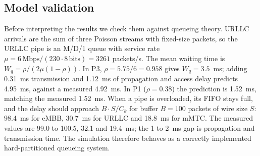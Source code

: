 \documentclass[conference]{IEEEtran}
\begin{document}
\begin{table}[t]
\centering
\caption{Per-phase results of the static 50/30/20 allocation (mean over 5 seeds; $\pm$ is the 95\% CI where it is not negligible)}
\label{tab:summary}
\setlength{\tabcolsep}{4pt}
\end{table}

\subsection{Model validation}
Before interpreting the results we check them against queueing theory. URLLC arrivals are the sum of three Poisson streams with fixed-size packets, so the URLLC pipe is an M/D/1 queue with service rate $\mu=6\,\text{Mbps}/(230\cdot 8\,\text{bits})=3261$ packets/s. The mean waiting time is $W_q=\rho/(2\mu(1-\rho))$. In P3, $\rho=5.75/6=0.958$ gives $W_q=3.5$~ms; adding 0.31~ms transmission and 1.12~ms of propagation and access delay predicts 4.95~ms, against a measured 4.92~ms. In P1 ($\rho=0.38$) the prediction is 1.52~ms, matching the measured 1.52~ms. When a pipe is overloaded, its FIFO stays full, and the delay should approach $B\cdot S/C_k$ for buffer $B=100$ packets of wire size $S$: 98.4~ms for eMBB, 30.7~ms for URLLC and 18.8~ms for mMTC. The measured values are 99.0 to 100.5, 32.1 and 19.4~ms; the 1 to 2~ms gap is propagation and transmission time. The simulation therefore behaves as a correctly implemented hard-partitioned queueing system.
\end{document}
